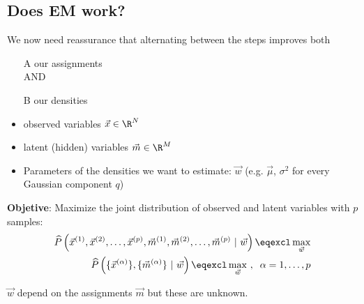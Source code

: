 \subsection{Does EM work?}

\begin{frame}{\subsecname}

We now need reassurance that alternating between the steps improves both
\begin{itemize}
\item[A] our assignments\\
AND\\
\item[B] our densities
\end{itemize}

\end{frame}

\begin{frame}{\subsecname}

\begin{itemize}
\item observed variables $\vec x \in \R^N$
\item latent (hidden) variables $\vec m \in \R^M$
\item Parameters of the densities we want to estimate: $\vec w$ (e.g. $\vec \mu$, $\sigma^2$ for every Gaussian component $q$)
\end{itemize}

\textbf{Objetive}: Maximize the joint distribution of observed and latent variables with $p$ samples:
\begin{align}
	\widehat{P} \left( \vec x^{(1)}, \vec x^{(2)},\ldots, \vec x^{(p)}, \vec m^{(1)}, \vec m^{(2)},\ldots, \vec m^{(p)}~|~\vec w \right) \eqexcl \max_{\vec w}\\
	\widehat{P} \left( \{\vec x^{(\alpha)}\}, \{\vec m^{(\alpha)}\}~|~\vec w \right) \eqexcl \max_{\vec w}~, \;\; \alpha=1,\ldots,p
\end{align}

$\vec w$ depend on the assignments $\vec m$ but these are unknown.

\pause


\end{frame}

